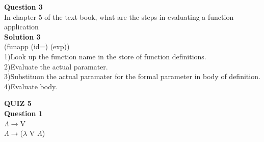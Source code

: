 \documentclass{article}
\begin{document}
\textbf{Question 3}\\
In chapter 5 of the text book, what are the steps in evaluating a function application\\
\textbf{Solution 3}\\
(funapp (id=) (exp))\\
1)Look up the function name in the store of function definitions.\\
2)Evaluate the actual paramater.\\
3)Substituon the actual paramater for the formal parameter in body of definition.\\
4)Evaluate body.\\
\maketitle
\textbf{QUIZ 5}\\
\textbf{Question 1}\\
 $\Lambda$$\rightarrow$V\\
 $\Lambda$$\rightarrow$($\lambda$ V $\Lambda$)\\
\end{document}
